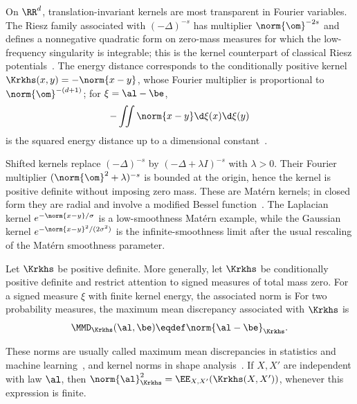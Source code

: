 \begin{example}
	On $\RR^d$, translation-invariant kernels are most transparent in Fourier variables. The Riesz family associated with $(-\Delta)^{-s}$ has multiplier $\norm{\om}^{-2s}$ and defines a nonnegative quadratic form on zero-mass measures for which the low-frequency singularity is integrable; this is the kernel counterpart of classical Riesz potentials~\cite{berg84harmonic}. The energy distance corresponds to the conditionally positive kernel $\Krkhs(x,y)=-\norm{x-y}$, whose Fourier multiplier is proportional to $\norm{\om}^{-(d+1)}$; for $\xi=\al-\be$,
	\[
		-\iint \norm{x-y}\d\xi(x)\d\xi(y)
	\]
	is the squared energy distance up to a dimensional constant~\cite{schoenberg38,szekely2004testing}.

	Shifted kernels replace $(-\Delta)^{-s}$ by $(-\Delta+\lambda I)^{-s}$ with $\lambda>0$. Their Fourier multiplier $(\norm{\om}^2+\lambda)^{-s}$ is bounded at the origin, hence the kernel is positive definite without imposing zero mass. These are Mat\'ern kernels; in closed form they are radial and involve a modified Bessel function~\cite{wendland2005scattered}. The Laplacian kernel $e^{-\norm{x-y}/\sigma}$ is a low-smoothness Mat\'ern example, while the Gaussian kernel $e^{-\norm{x-y}^2/(2\sigma^2)}$ is the infinite-smoothness limit after the usual rescaling of the Mat\'ern smoothness parameter.
\end{example}

\begin{defn}\label{def-kernel-mmd-norm}
	Let $\Krkhs$ be positive definite. More generally, let $\Krkhs$ be conditionally positive definite and restrict attention to signed measures of total mass zero. For a signed measure $\xi$ with finite kernel energy, the associated norm is
	For two probability measures, the maximum mean discrepancy associated with $\Krkhs$ is
	\[
		\MMD_{\Krkhs}(\al,\be)\eqdef\norm{\al-\be}_{\Krkhs}.
	\]
\end{defn}

These norms are usually called maximum mean discrepancies in statistics and machine learning~\cite{gretton2012kernel,muandet2017kernel}, and kernel norms in shape analysis~\cite{Hofmann2008}. If $X,X'$ are independent with law $\al$, then \(\norm{\al}_{\Krkhs}^2=\EE_{X,X'}(\Krkhs(X,X'))\), whenever this expression is finite.


